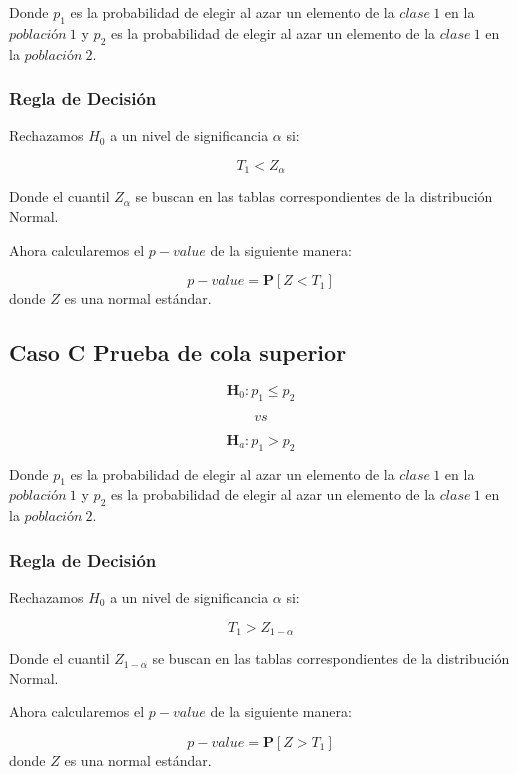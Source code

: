 \documentclass[
  a4paper,
  oneside,
  openany]{book}
\begin{document}
Donde \(p_{1}\) es la probabilidad de elegir al azar un elemento de la \(clase\ 1\) en la \(población\ 1\) y \(p_{2}\) es la probabilidad de elegir al azar un elemento de la \(clase\ 1\) en la \(población\ 2\).

\hypertarget{regla-de-decisiuxf3n-22}{%
\subsubsection*{Regla de Decisión}\label{regla-de-decisiuxf3n-22}}


Rechazamos \(H_0\) a un nivel de significancia \(\alpha\) si:

\[T_{1}< Z_{\alpha}\]

Donde el cuantil \(Z_{\alpha}\) se buscan en las tablas correspondientes de la distribución Normal.

Ahora calcularemos el \(p-value\) de la siguiente manera:

\[p-value=\mathbf{P}[Z<T_{1}]\]
donde \(Z\) es una normal estándar.

\hypertarget{caso-c-prueba-de-cola-superior-5}{%
\subsection*{Caso C Prueba de cola superior}\label{caso-c-prueba-de-cola-superior-5}}


\[\textbf{H}_0: p_{1} \leq p_{2}\]

\[vs\]

\[\textbf{H}_a: p_{1} > p_{2}\]

Donde \(p_{1}\) es la probabilidad de elegir al azar un elemento de la \(clase\ 1\) en la \(población\ 1\) y \(p_{2}\) es la probabilidad de elegir al azar un elemento de la \(clase\ 1\) en la \(población\ 2\).

\hypertarget{regla-de-decisiuxf3n-23}{%
\subsubsection*{Regla de Decisión}\label{regla-de-decisiuxf3n-23}}


Rechazamos \(H_0\) a un nivel de significancia \(\alpha\) si:

\[T_{1} > Z_{1-\alpha}\]

Donde el cuantil \(Z_{1-\alpha}\) se buscan en las tablas correspondientes de la distribución Normal.

Ahora calcularemos el \(p-value\) de la siguiente manera:

\[p-value=\mathbf{P}[Z>T_{1}]\]
donde \(Z\) es una normal estándar.
\end{document}
